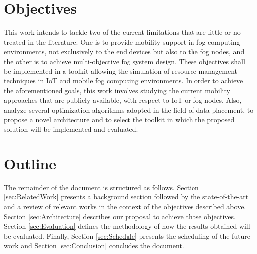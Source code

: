 
\section{Objectives}\label{subsec:Objectives}
This work intends to tackle two of the current limitations that are little or no treated in the literature. One is to provide mobility support in fog computing environments, not exclusively to the end devices but also to the fog nodes, and the other is to achieve multi-objective fog system design. These objectives shall be implemented in a toolkit allowing the simulation of resource management techniques in IoT and mobile fog computing environments. In order to achieve the aforementioned goals, this work involves studying the current mobility approaches that are publicly available, with respect to IoT or fog nodes. Also, analyze several optimization algorithms adopted in the field of data placement, to propose a novel architecture and to select the toolkit in which the proposed solution will be implemented and evaluated.

\section{Outline}\label{subsec:Outline}
The remainder of the document is structured as follows. Section \ref{sec:RelatedWork} presents a background section followed by the state-of-the-art and a review of relevant works in the context of the objectives described above. Section \ref{sec:Architecture} describes our proposal to achieve those objectives. Section \ref{sec:Evaluation} defines the methodology of how the results obtained will be evaluated. Finally, Section \ref{sec:Schedule} presents the scheduling of the future work and Section \ref{sec:Conclusion} concludes the document.